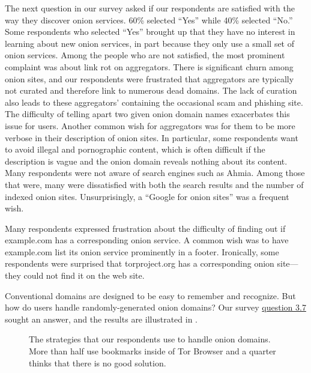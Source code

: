 The next question in our survey asked if our respondents are satisfied with the
way they discover onion services.  60\% selected ``Yes'' while 40\% selected
``No.'' Some respondents who selected ``Yes'' brought up that they have no
interest in learning about new onion services, in part because they only use a
small set of onion services.  Among the people who are not satisfied, the most
prominent complaint was about link rot on aggregators.  There is significant
churn among onion sites, and our respondents were frustrated that aggregators
are typically not curated and therefore link to numerous dead domains.  The lack
of curation also leads to these aggregators' containing the occasional scam and
phishing site.  The difficulty of telling apart two given onion domain names
exacerbates this issue for users.  Another common wish for aggregators was for
them to be more verbose in their description of onion sites.  In particular,
some respondents want to avoid illegal and pornographic content, which is often
difficult if the description is vague and the onion domain reveals nothing about
its content.  Many respondents were not aware of search engines such as Ahmia.
Among those that were, many were dissatisfied with both the search results and
the number of indexed onion sites.  Unsurprisingly, a ``Google for onion sites''
was a frequent wish.

Many respondents expressed frustration about the difficulty of finding out if
example.com has a corresponding onion service.  A common wish was to have
example.com list its onion service prominently in a footer.  Ironically, some
respondents were surprised that torproject.org has a corresponding onion
site---they could not find it on the web site.

Conventional domains are designed to be easy to remember and recognize.  But how
do users handle randomly-generated onion domains?  Our survey
\hyperref[q3_7]{question 3.7} sought an answer, and the results are illustrated
in .

\begin{figure}[t]
    \centering
    
    \caption{The strategies that our respondents use to handle onion domains.
    More than half use bookmarks inside of Tor Browser and a quarter thinks that
    there is no good solution.}
    \label{fig:onion-domain-mgmt}
\end{figure}

